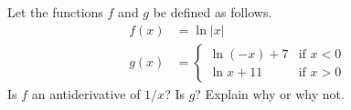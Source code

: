 Let the functions $f$ and $g$ be defined as follows.
\begin{align*}
  f(x) &= \ln|x| \\
  g(x) &=  \begin{cases}
   \ln(-x)+7 & \text{if } x < 0 \\
   \ln x+11  & \text{if } x > 0
  \end{cases}
\end{align*}
Is $f$ an antiderivative of $1/x$? Is $g$? Explain
why or why not.

